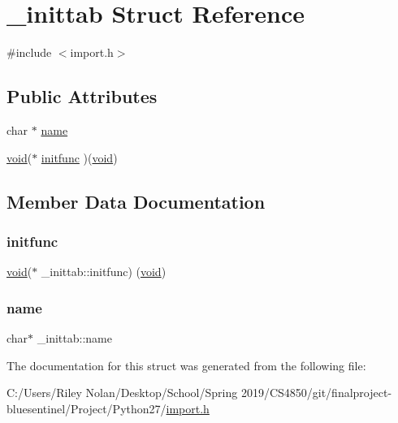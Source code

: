 \hypertarget{struct__inittab}{}\section{\+\_\+inittab Struct Reference}
\label{struct__inittab}


{\ttfamily \#include $<$import.\+h$>$}

\subsection*{Public Attributes}
\begin{DoxyCompactItemize}
\item 
char $\ast$ \mbox{\hyperlink{struct__inittab_abb6d7fc45bd3c8a9ecf707f5c1397385}{name}}
\item 
\mbox{\hyperlink{_s_d_l__opengles2__gl2ext_8h_ae5d8fa23ad07c48bb609509eae494c95}{void}}($\ast$ \mbox{\hyperlink{struct__inittab_afd7487f89cc489d793eff8f4249d44bc}{initfunc}} )(\mbox{\hyperlink{_s_d_l__opengles2__gl2ext_8h_ae5d8fa23ad07c48bb609509eae494c95}{void}})
\end{DoxyCompactItemize}


\subsection{Member Data Documentation}
\mbox{\label{struct__inittab_afd7487f89cc489d793eff8f4249d44bc}} 
\subsubsection{\texorpdfstring{initfunc}{initfunc}}
{\footnotesize\ttfamily \mbox{\hyperlink{_s_d_l__opengles2__gl2ext_8h_ae5d8fa23ad07c48bb609509eae494c95}{void}}($\ast$ \+\_\+inittab\+::initfunc) (\mbox{\hyperlink{_s_d_l__opengles2__gl2ext_8h_ae5d8fa23ad07c48bb609509eae494c95}{void}})}

\mbox{\label{struct__inittab_abb6d7fc45bd3c8a9ecf707f5c1397385}} 
\subsubsection{\texorpdfstring{name}{name}}
{\footnotesize\ttfamily char$\ast$ \+\_\+inittab\+::name}



The documentation for this struct was generated from the following file\+:\begin{DoxyCompactItemize}
\item 
C\+:/\+Users/\+Riley Nolan/\+Desktop/\+School/\+Spring 2019/\+C\+S4850/git/finalproject-\/bluesentinel/\+Project/\+Python27/\mbox{\hyperlink{import_8h}{import.\+h}}\end{DoxyCompactItemize}
